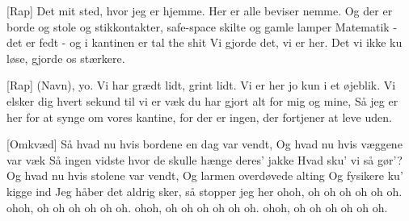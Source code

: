 \documentclass[a4paper,11pt]{article}
\begin{document}
\begin{song}
[Rap] Det mit sted, hvor jeg er hjemme. Her er alle beviser nemme.
Og der er borde og stole og stikkontakter, safe-space skilte og
gamle lamper
Matematik - det er fedt - og i kantinen er tal the shit
Vi gjorde det, vi er her. Det vi ikke ku løse, gjorde os stærkere.

[Rap] (Navn), yo. Vi har grædt lidt, grint lidt. Vi er her jo kun i et
øjeblik.
Vi elsker dig hvert sekund til vi er væk
du har gjort alt for mig og mine,
Så jeg er her for at synge om vores kantine,
for der er ingen, der fortjener at leve uden.

[Omkvæd] Så hvad nu hvis bordene en dag var vendt,
Og hvad nu hvis væggene var væk
Så ingen vidste hvor de skulle hænge deres’ jakke
Hvad sku’ vi så gør’?
Og hvad nu hvis stolene var vendt,
Og larmen overdøvede alting
Og fysikere ku’ kigge ind
Jeg håber det aldrig sker, så stopper jeg her
ohoh, oh oh oh oh oh oh. ohoh, oh oh oh oh oh oh.
ohoh, oh oh oh oh oh oh. ohoh, oh oh oh oh oh oh.
\end{song}
\end{document}
